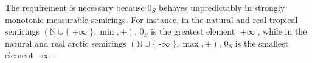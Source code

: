 \begin{remark}
    \label{remark:semiring_0_unpredictable}
    The requirement  is necessary because \(0_S\) behaves unpredictably in strongly monotonic measurable semirings. For instance, in the natural and real tropical semirings \((\mathbb{N} \mathop{\cup} \{\mathop{+\infty}\}, \mathop{\min}, +)\), \(0_S\) is the greatest element \(\mathop{+\infty}\), while in the natural and real arctic semirings \((\mathbb{N} \mathop{\cup} \{\mathop{-\infty}\}, \max, +)\), \(0_S\) is the smallest element \(\mathop{-\infty}\).
\end{remark}